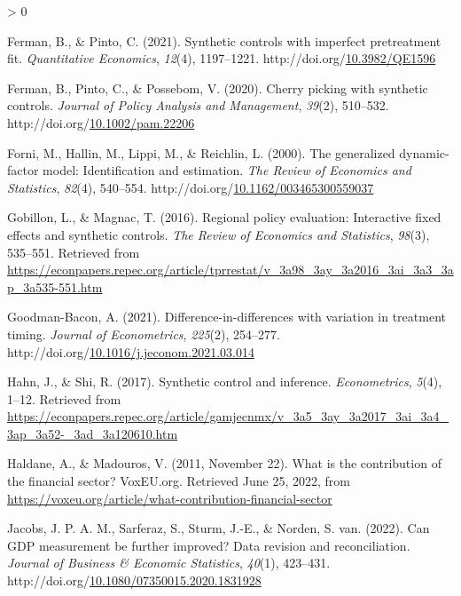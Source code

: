 \documentclass[12pt,nobind, a4paper]{reedthesis}
\newlength{\cslhangindent}
\newenvironment{CSLReferences}[2] %
{%
	\setlength{\parindent}{0pt}
	\ifodd #1 \everypar{\setlength{\hangindent}{\cslhangindent}}\ignorespaces\fi
	\ifnum #2 > 0
	\setlength{\parskip}{#2\baselineskip}
	\fi
}%
{}
\begin{document}
\begin{CSLReferences}{1}{0}
 \leavevmode\hypertarget{ref-ferman_synthetic_2021}{}%
 Ferman, B., \& Pinto, C. (2021). Synthetic controls with imperfect pretreatment fit. \emph{Quantitative Economics}, \emph{12}(4), 1197--1221. http://doi.org/\href{https://doi.org/10.3982/QE1596}{10.3982/QE1596}

 \leavevmode\hypertarget{ref-ferman_cherry_2020}{}%
 Ferman, B., Pinto, C., \& Possebom, V. (2020). Cherry picking with synthetic controls. \emph{Journal of Policy Analysis and Management}, \emph{39}(2), 510--532. http://doi.org/\href{https://doi.org/10.1002/pam.22206}{10.1002/pam.22206}

 \leavevmode\hypertarget{ref-forni_generalized_2000}{}%
 Forni, M., Hallin, M., Lippi, M., \& Reichlin, L. (2000). The generalized dynamic-factor model: Identification and estimation. \emph{The Review of Economics and Statistics}, \emph{82}(4), 540--554. http://doi.org/\href{https://doi.org/10.1162/003465300559037}{10.1162/003465300559037}

 \leavevmode\hypertarget{ref-gobillon_regional_2016}{}%
 Gobillon, L., \& Magnac, T. (2016). Regional policy evaluation: Interactive fixed effects and synthetic controls. \emph{The Review of Economics and Statistics}, \emph{98}(3), 535--551. Retrieved from \url{https://econpapers.repec.org/article/tprrestat/v_3a98_3ay_3a2016_3ai_3a3_3ap_3a535-551.htm}

 \leavevmode\hypertarget{ref-goodman-bacon_difference_differences_2021}{}%
 Goodman-Bacon, A. (2021). Difference-in-differences with variation in treatment timing. \emph{Journal of Econometrics}, \emph{225}(2), 254--277. http://doi.org/\href{https://doi.org/10.1016/j.jeconom.2021.03.014}{10.1016/j.jeconom.2021.03.014}

 \leavevmode\hypertarget{ref-hahn_synthetic_2017}{}%
 Hahn, J., \& Shi, R. (2017). Synthetic control and inference. \emph{Econometrics}, \emph{5}(4), 1--12. Retrieved from \url{https://econpapers.repec.org/article/gamjecnmx/v_3a5_3ay_3a2017_3ai_3a4_3ap_3a52-_3ad_3a120610.htm}

 \leavevmode\hypertarget{ref-haldane_what_2011}{}%
 Haldane, A., \& Madouros, V. (2011, November 22). What is the contribution of the financial sector? {VoxEU}.org. Retrieved June 25, 2022, from \url{https://voxeu.org/article/what-contribution-financial-sector}

 \leavevmode\hypertarget{ref-jacobs_can_2022}{}%
 Jacobs, J. P. A. M., Sarferaz, S., Sturm, J.-E., \& Norden, S. van. (2022). Can {GDP} measurement be further improved? Data revision and reconciliation. \emph{Journal of Business \& Economic Statistics}, \emph{40}(1), 423--431. http://doi.org/\href{https://doi.org/10.1080/07350015.2020.1831928}{10.1080/07350015.2020.1831928}


\end{CSLReferences}
\end{document}

